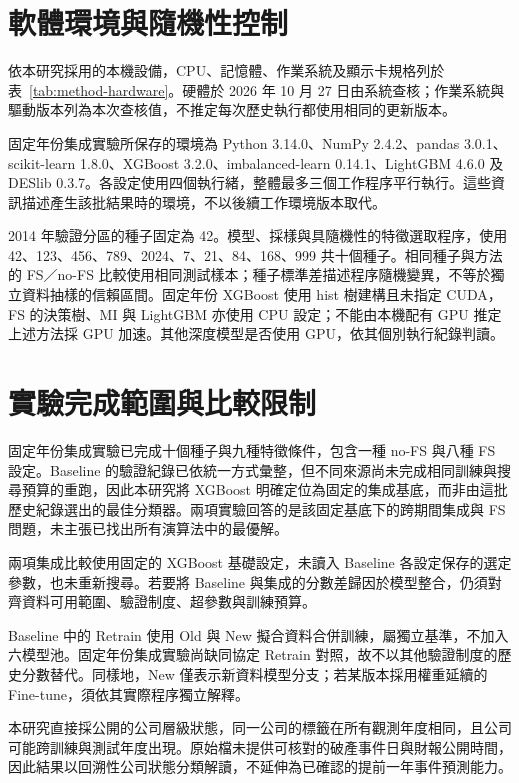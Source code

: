 \section{軟體環境與隨機性控制}

依本研究採用的本機設備，CPU、記憶體、作業系統及顯示卡規格列於表~\ref{tab:method-hardware}。硬體於 2026 年 10 月 27 日由系統查核；作業系統與驅動版本列為本次查核值，不推定每次歷史執行都使用相同的更新版本。



固定年份集成實驗所保存的環境為 Python 3.14.0、NumPy 2.4.2、pandas 3.0.1、scikit-learn 1.8.0、XGBoost 3.2.0、imbalanced-learn 0.14.1、LightGBM 4.6.0 及 DESlib 0.3.7。各設定使用四個執行緒，整體最多三個工作程序平行執行。這些資訊描述產生該批結果時的環境，不以後續工作環境版本取代。

2014 年驗證分區的種子固定為 42。模型、採樣與具隨機性的特徵選取程序，使用 42、123、456、789、2024、7、21、84、168、999 共十個種子。相同種子與方法的 FS／no-FS 比較使用相同測試樣本；種子標準差描述程序隨機變異，不等於獨立資料抽樣的信賴區間。固定年份 XGBoost 使用 hist 樹建構且未指定 CUDA，FS 的決策樹、MI 與 LightGBM 亦使用 CPU 設定；不能由本機配有 GPU 推定上述方法採 GPU 加速。其他深度模型是否使用 GPU，依其個別執行紀錄判讀。

\section{實驗完成範圍與比較限制}\label{sec:method-evidence}

固定年份集成實驗已完成十個種子與九種特徵條件，包含一種 no-FS 與八種 FS 設定。Baseline 的驗證紀錄已依統一方式彙整，但不同來源尚未完成相同訓練與搜尋預算的重跑，因此本研究將 XGBoost 明確定位為固定的集成基底，而非由這批歷史紀錄選出的最佳分類器。兩項實驗回答的是該固定基底下的跨期間集成與 FS 問題，未主張已找出所有演算法中的最優解。

兩項集成比較使用固定的 XGBoost 基礎設定，未讀入 Baseline 各設定保存的選定參數，也未重新搜尋。若要將 Baseline 與集成的分數差歸因於模型整合，仍須對齊資料可用範圍、驗證制度、超參數與訓練預算。

Baseline 中的 Retrain 使用 Old 與 New 擬合資料合併訓練，屬獨立基準，不加入六模型池。固定年份集成實驗尚缺同協定 Retrain 對照，故不以其他驗證制度的歷史分數替代。同樣地，New 僅表示新資料模型分支；若某版本採用權重延續的 Fine-tune，須依其實際程序獨立解釋。

本研究直接採公開的公司層級狀態，同一公司的標籤在所有觀測年度相同，且公司可能跨訓練與測試年度出現。原始檔未提供可核對的破產事件日與財報公開時間，因此結果以回溯性公司狀態分類解讀，不延伸為已確認的提前一年事件預測能力。

